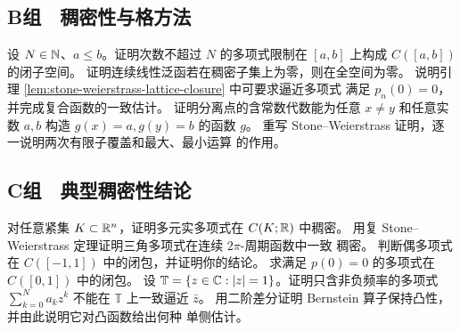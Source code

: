 \subsection*{B组　稠密性与格方法}
\begin{enumerate}[label=\textbf{\thechapter.\arabic*.},resume]
 设 $N\in\mathbb{N}$、$a\le b$。证明次数不超过 $N$ 的多项式限制在
 $[a,b]$ 上构成 $C([a,b])$ 的闭子空间。
 证明连续线性泛函若在稠密子集上为零，则在全空间为零。
 说明引理 \ref{lem:stone-weierstrass-lattice-closure} 中可要求逼近多项式
 满足 $p_n(0)=0$，并完成复合函数的一致估计。
 证明分离点的含常数代数能为任意 $x\ne y$ 和任意实数 $a,b$ 构造
 $g(x)=a,g(y)=b$ 的函数 $g$。
 重写 Stone--Weierstrass 证明，逐一说明两次有限子覆盖和最大、最小运算
 的作用。
\end{enumerate}

\subsection*{C组　典型稠密性结论}
\begin{enumerate}[label=\textbf{\thechapter.\arabic*.},resume]
 对任意紧集 $K\subset\mathbb{R}^n$，证明多元实多项式在 $C(K;\mathbb{R})$ 中稠密。
 用复 Stone--Weierstrass 定理证明三角多项式在连续 $2\pi$-周期函数中一致
 稠密。
 判断偶多项式在 $C([-1,1])$ 中的闭包，并证明你的结论。
 求满足 $p(0)=0$ 的多项式在 $C([0,1])$ 中的闭包。
 设 $\mathbb T=\{z\in\mathbb{C}:|z|=1\}$。证明只含非负频率的多项式
 $\sum_{k=0}^Na_kz^k$ 不能在 $\mathbb T$ 上一致逼近 $\bar z$。
 用二阶差分证明 Bernstein 算子保持凸性，并由此说明它对凸函数给出何种
 单侧估计。
\end{enumerate}
